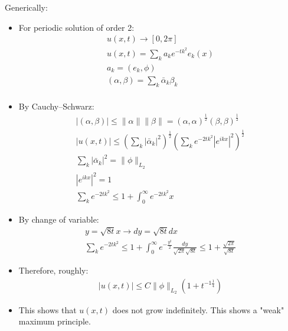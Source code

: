\documentclass[12pt, a4paper]{article}
\begin{document}
Generically:
\begin{itemize}
    \item For periodic solution of order 2:
    \begin{gather*}
        u(x,t) \rightarrow [0, 2\pi]\\
        u(x, t) = \sum_k a_k e^{-tk^2}e_k(x)\\
        a_k = (e_k, \phi)\\
        (\alpha, \beta) = \sum_k \bar{\alpha}_k \beta_k\\
    \end{gather*}
    \item By Cauchy–Schwarz:
    \begin{gather*}
        |(\alpha, \beta)| \leq \|\alpha\|\|\beta\| = (\alpha, \alpha)^{\frac{1}{2}}(\beta, \beta)^{\frac{1}{2}}\\
        |u(x, t)| \leq \left(\sum_k |\bar{\alpha}_k|^2\right)^{\frac{1}{2}}\left(\sum_k e^{-2tk^2}|e^{ikx}|^2\right)^{\frac{1}{2}}\\
        \sum_k |\bar{\alpha}_k|^2 = \|\phi\|_{L_2}\\
        |e^{ikx}|^2 = 1\\
        \sum_k e^{-2tk^2} \leq 1 + \int_0^\infty e^{-2tk^2}x
    \end{gather*}
    \item By change of variable:
    \begin{gather*}
        y = \sqrt{8t}x \rightarrow dy = \sqrt{8t}dx\\
        \sum_k e^{-2tk^2} \leq 1 + \int_0^\infty e^{-\frac{y^2}{2}}\frac{dy}{\sqrt{2\pi}\sqrt{8t}} \leq 1+\frac{\sqrt{2\pi}}{\sqrt{8t}}
    \end{gather*}
    \item Therefore, roughly:
    \begin{gather*}
        |u(x, t)| \leq C\|\phi\|_{L_2}(1+t^{-1\frac{1}{4}})
    \end{gather*}
    \item This shows that $u(x, t)$ does not grow indefinitely. This shows a "weak" maximum principle.
\end{itemize}

\vspace{0.3em}
\end{document}
